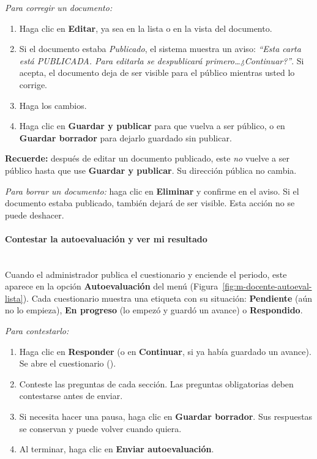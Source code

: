 
\textit{Para corregir un documento:}
\begin{enumerate}
    \item Haga clic en \textbf{Editar}, ya sea en la lista o en la vista del documento.
    \item Si el documento estaba \emph{Publicado}, el sistema muestra un aviso: \emph{``Esta carta está PUBLICADA. Para editarla se despublicará primero\ldots ¿Continuar?''}. Si acepta, el documento deja de ser visible para el público mientras usted lo corrige.
    \item Haga los cambios.
    \item Haga clic en \textbf{Guardar y publicar} para que vuelva a ser público, o en \textbf{Guardar borrador} para dejarlo guardado sin publicar.
\end{enumerate}

\textbf{Recuerde:} después de editar un documento publicado, este \emph{no} vuelve a ser público hasta que use \textbf{Guardar y publicar}. Su dirección pública no cambia.

\textit{Para borrar un documento:} haga clic en \textbf{Eliminar} y confirme en el aviso. Si el documento estaba publicado, también dejará de ser visible. Esta acción no se puede deshacer.

\paragraph{Contestar la autoevaluación y ver mi resultado}\label{apx:manual-user:profesor-autoeval}\mbox{}\\
Cuando el administrador publica el cuestionario y enciende el periodo, este aparece en la opción \textbf{Autoevaluación} del menú (Figura~\ref{fig:m-docente-autoeval-lista}). Cada cuestionario muestra una etiqueta con su situación: \textbf{Pendiente} (aún no lo empieza), \textbf{En progreso} (lo empezó y guardó un avance) o \textbf{Respondido}.


\textit{Para contestarlo:}
\begin{enumerate}
    \item Haga clic en \textbf{Responder} (o en \textbf{Continuar}, si ya había guardado un avance). Se abre el cuestionario ().
    \item Conteste las preguntas de cada sección. Las preguntas obligatorias deben contestarse antes de enviar.
    \item Si necesita hacer una pausa, haga clic en \textbf{Guardar borrador}. Sus respuestas se conservan y puede volver cuando quiera.
    \item Al terminar, haga clic en \textbf{Enviar autoevaluación}.
\end{enumerate}

